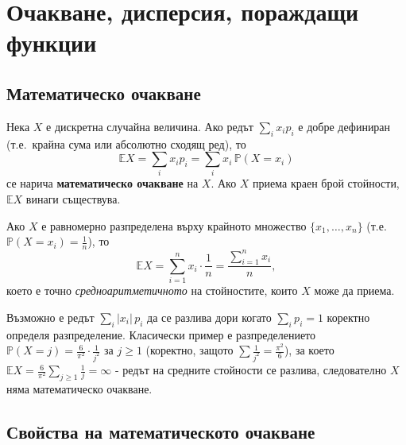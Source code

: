 \chapter{Очакване, дисперсия, пораждащи функции}

\section{Математическо очакване}

\begin{defbox}
Нека $X$ е дискретна случайна величина. Ако редът $\sum_i x_i p_i$ е
добре дефиниран (т.е.\ крайна сума или абсолютно сходящ ред), то
\[
  \mathbb E X = \sum_i x_i p_i = \sum_i x_i\,\mathbb P(X=x_i)
\]
се нарича \textbf{математическо очакване} на $X$. Ако $X$ приема
краен брой стойности, $\mathbb E X$ винаги съществува.
\end{defbox}

\begin{rembox}
Ако $X$ е равномерно разпределена върху крайното множество
$\{x_1,\dots,x_n\}$ (т.е.\ $\mathbb P(X=x_i)=\tfrac1n$), то
\[
  \mathbb E X = \sum_{i=1}^{n} x_i\cdot\frac1n = \frac{\sum_{i=1}^{n}x_i}{n},
\]
което е точно \emph{средноаритметичното} на стойностите, които $X$
може да приема.
\end{rembox}

\begin{rembox}
Възможно е редът $\sum_i |x_i|\,p_i$ да се разлива дори когато
$\sum_i p_i=1$ коректно определя разпределение. Класически пример е
разпределението $\mathbb P(X=j)=\tfrac{6}{\pi^2}\cdot\tfrac1{j^2}$ за
$j\ge 1$ (коректно, защото $\sum \tfrac1{j^2}=\tfrac{\pi^2}{6}$), за
което $\mathbb E X = \tfrac{6}{\pi^2}\sum_{j\ge1}\tfrac1j = \infty$ -
редът на средните стойности се разлива, следователно $X$ няма
математическо очакване.
\end{rembox}

\section{Свойства на математическото очакване}

